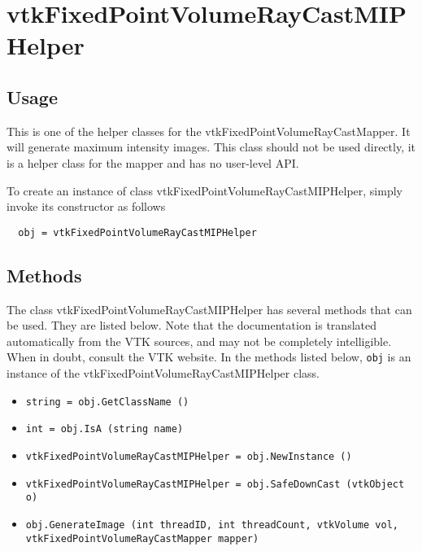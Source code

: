 \section{vtkFixedPointVolumeRayCastMIPHelper}

\subsection{Usage}

 This is one of the helper classes for the vtkFixedPointVolumeRayCastMapper.
 It will generate maximum intensity images.
 This class should not be used directly, it is a helper class for
 the mapper and has no user-level API.


To create an instance of class vtkFixedPointVolumeRayCastMIPHelper, simply
invoke its constructor as follows
\begin{verbatim}
  obj = vtkFixedPointVolumeRayCastMIPHelper
\end{verbatim}
\subsection{Methods}

The class vtkFixedPointVolumeRayCastMIPHelper has several methods that can be used.
  They are listed below.
Note that the documentation is translated automatically from the VTK sources,
and may not be completely intelligible.  When in doubt, consult the VTK website.
In the methods listed below, \verb|obj| is an instance of the vtkFixedPointVolumeRayCastMIPHelper class.
\begin{itemize}
\item  \verb|string = obj.GetClassName ()|

\item  \verb|int = obj.IsA (string name)|

\item  \verb|vtkFixedPointVolumeRayCastMIPHelper = obj.NewInstance ()|

\item  \verb|vtkFixedPointVolumeRayCastMIPHelper = obj.SafeDownCast (vtkObject o)|

\item  \verb|obj.GenerateImage (int threadID, int threadCount, vtkVolume vol, vtkFixedPointVolumeRayCastMapper mapper)|

\end{itemize}
